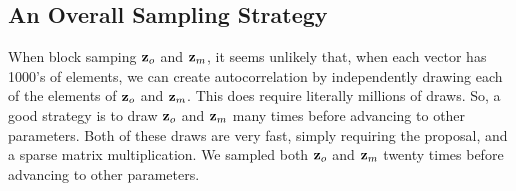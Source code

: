 \documentclass[11pt, titlepage]{article}
\begin{document}
\begin{flushleft}
\begin{onehalfspace}

\subsection*{An Overall Sampling Strategy}

When block samping $\mathbf{z}_{o}$ and $\mathbf{z}_{m}$, it seems unlikely that, when each vector has 1000's of elements, we can create autocorrelation by independently drawing each of the elements of $\mathbf{z}_{o}$ and $\mathbf{z}_{m}$.  This does require literally millions of draws.  So, a good strategy is to draw $\mathbf{z}_{o}$ and $\mathbf{z}_{m}$ many times before advancing to other parameters.  Both of these draws are very fast, simply requiring the proposal, and a sparse matrix multiplication.  We sampled both $\mathbf{z}_{o}$ and $\mathbf{z}_{m}$ twenty times before advancing to other parameters.




\end{onehalfspace}
\end{flushleft}
\end{document}
